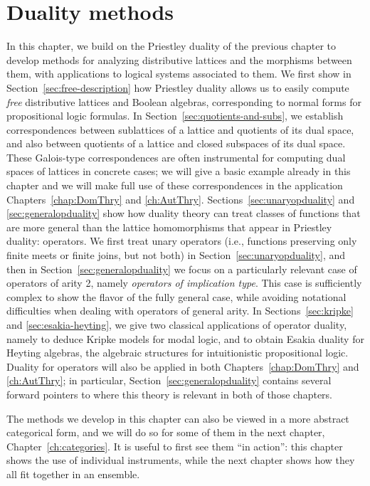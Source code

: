\chapter{Duality methods}\label{ch:methods}

In this chapter, we build on the Priestley duality of the previous chapter to develop methods for analyzing distributive lattices and the morphisms between them, with applications to logical systems associated to them. We first show in Section~\ref{sec:free-description} how Priestley duality allows us to easily compute \emph{free} distributive lattices and Boolean algebras, corresponding to normal forms for propositional logic formulas. In Section~\ref{sec:quotients-and-subs}, we establish correspondences between sublattices of a lattice and quotients of its dual space, and also between quotients of a lattice and closed subspaces of its dual space. These Galois-type correspondences are often instrumental for computing dual spaces of lattices in concrete cases; we will give a basic example already in this chapter and we will make full use of these correspondences in the application Chapters~\ref{chap:DomThry} and \ref{ch:AutThry}. Sections~\ref{sec:unaryopduality} and \ref{sec:generalopduality} show how duality theory can treat classes of functions that are more general than the lattice homomorphisms that appear in Priestley duality: operators.
 We first treat unary operators (i.e., functions preserving only finite meets or finite joins, but not both) in Section~\ref{sec:unaryopduality}, and then in Section~\ref{sec:generalopduality} we focus on a particularly relevant case of operators of arity 2, namely \emph{operators of implication type}. This case is sufficiently complex to show the flavor of the fully general case, while avoiding notational difficulties when dealing with operators of general arity. In Sections~\ref{sec:kripke} and \ref{sec:esakia-heyting}, we give two classical applications of operator duality, namely to deduce Kripke models for modal logic, and to obtain Esakia duality for Heyting algebras, the algebraic structures for intuitionistic propositional logic. Duality for operators will also be applied in both Chapters~\ref{chap:DomThry} and \ref{ch:AutThry}; in particular, Section~\ref{sec:generalopduality} contains several forward pointers to where this theory is relevant in both of those chapters. 

The methods we develop in this chapter can also be viewed in a more abstract categorical form, and we will do so for some of them in the next chapter, Chapter~\ref{ch:categories}. It is useful to first see them ``in action'': this chapter shows the use of individual instruments, while the next chapter shows how they all fit together in an ensemble. 

